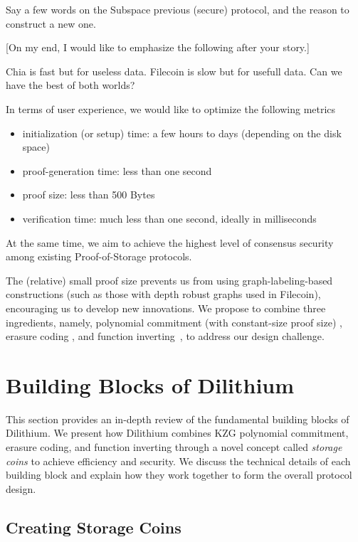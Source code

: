 \documentclass[conference]{IEEEtran}
\begin{document}
Say a few words on the Subspace previous (secure) protocol, and the reason to construct a new one.

[On my end, I would like to emphasize the following after your story.]


Chia is fast but for useless data. Filecoin is slow but for usefull data. Can we have the best of both worlds?

In terms of user experience, we would like to optimize the following metrics
\begin{itemize}
    \item initialization (or setup) time: a few hours to days (depending on the disk space)
    \item proof-generation time: less than one second
    \item proof size: less than 500 Bytes
    \item verification time: much less than one second, ideally in milliseconds
\end{itemize}
At the same time, we aim to achieve the highest level of {consensus security} among existing Proof-of-Storage protocols. 

The (relative) small proof size prevents us from using graph-labeling-based constructions (such as those with depth robust graphs used in Filecoin), encouraging us to develop new innovations. We propose to combine three ingredients, namely, polynomial commitment (with constant-size proof size) \cite{KZG_paper}, erasure coding \cite{erasure}, and function inverting~\cite{beyond_hellman}, to address our design challenge. 

\section{Building Blocks of Dilithium}

This section provides an in-depth review of the fundamental building blocks of Dilithium.
We present how Dilithium combines KZG polynomial commitment, erasure coding, and function inverting through a novel concept called \emph{storage coins} to achieve efficiency and security. We discuss the technical details of each building block and explain how they work together to form the overall protocol design. 

\subsection{Creating Storage Coins}
\end{document}
